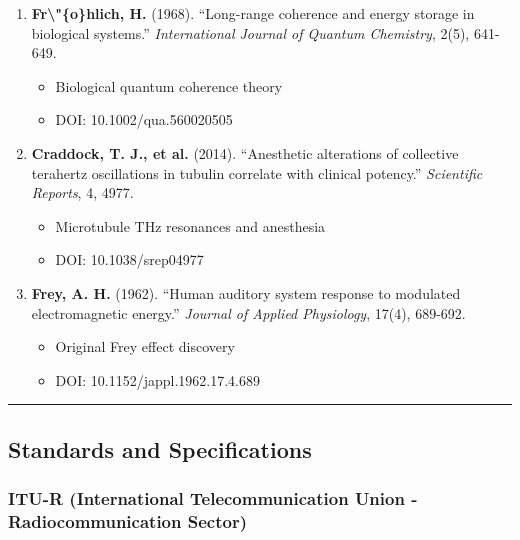 \begin{enumerate}
\def\labelenumi{\arabic{enumi}.}
\setcounter{enumi}{22}
\tightlist
\item
  \textbf{Fr\textbackslash"\{o\}hlich, H.} (1968). ``Long-range
  coherence and energy storage in biological systems.''
  \emph{International Journal of Quantum Chemistry}, 2(5), 641-649.

  \begin{itemize}
  \tightlist
  \item
    Biological quantum coherence theory
  \item
    DOI: 10.1002/qua.560020505
  \end{itemize}
\item
  \textbf{Craddock, T. J., et al.} (2014). ``Anesthetic alterations of
  collective terahertz oscillations in tubulin correlate with clinical
  potency.'' \emph{Scientific Reports}, 4, 4977.

  \begin{itemize}
  \tightlist
  \item
    Microtubule THz resonances and anesthesia
  \item
    DOI: 10.1038/srep04977
  \end{itemize}
\item
  \textbf{Frey, A. H.} (1962). ``Human auditory system response to
  modulated electromagnetic energy.'' \emph{Journal of Applied
  Physiology}, 17(4), 689-692.

  \begin{itemize}
  \tightlist
  \item
    Original Frey effect discovery
  \item
    DOI: 10.1152/jappl.1962.17.4.689
  \end{itemize}
\end{enumerate}

\begin{center}\rule{0.5\linewidth}{0.5pt}\end{center}

\subsection{\texorpdfstring{ Standards and
Specifications}{ Standards and Specifications}}\label{standards-and-specifications}

\subsubsection{ITU-R (International Telecommunication Union -
Radiocommunication
Sector)}\label{itu-r-international-telecommunication-union---radiocommunication-sector}

